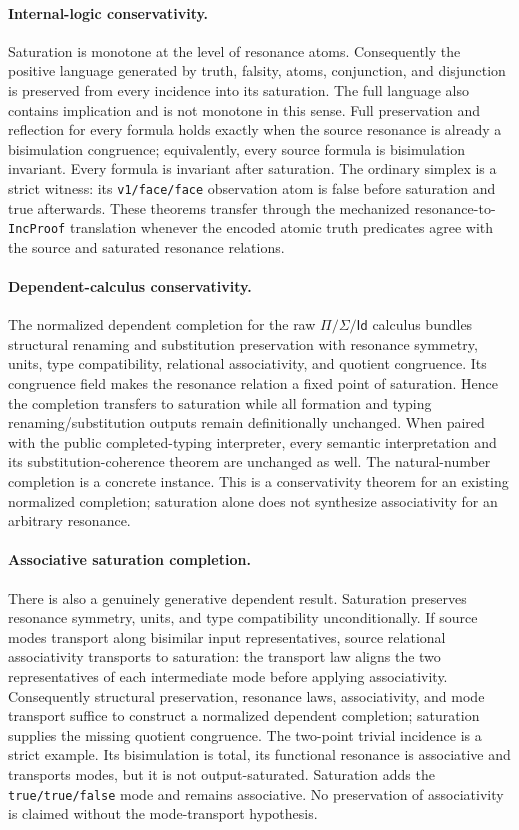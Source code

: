 \documentclass[11pt]{article}
\theoremstyle{definition}
\begin{document}
\paragraph{Internal-logic conservativity.}
Saturation is monotone at the level of resonance atoms.  Consequently the
positive language generated by truth, falsity, atoms, conjunction, and
disjunction is preserved from every incidence into its saturation.  The full
language also contains implication and is not monotone in this sense.  Full
preservation and reflection for every formula holds exactly when the source
resonance is already a bisimulation congruence; equivalently, every source
formula is bisimulation invariant.  Every formula is invariant after
saturation.  The ordinary simplex is a strict witness: its
\texttt{v1/face/face} observation atom is false before saturation and true
afterwards.  These theorems transfer through the mechanized
resonance-to-\texttt{IncProof} translation whenever the encoded atomic truth
predicates agree with the source and saturated resonance relations.

\paragraph{Dependent-calculus conservativity.}
The normalized dependent completion for the raw $\Pi/\Sigma/\mathsf{Id}$
calculus bundles structural renaming and substitution preservation with
resonance symmetry, units, type compatibility, relational associativity, and
quotient congruence.  Its congruence field makes the resonance relation a fixed
point of saturation.  Hence the completion transfers to saturation while all
formation and typing renaming/substitution outputs remain definitionally
unchanged.  When paired with the public completed-typing interpreter, every
semantic interpretation and its substitution-coherence theorem are unchanged
as well.  The natural-number completion is a concrete instance.  This is a
conservativity theorem for an existing normalized completion; saturation alone
does not synthesize associativity for an arbitrary resonance.

\paragraph{Associative saturation completion.}
There is also a genuinely generative dependent result.  Saturation preserves
resonance symmetry, units, and type compatibility unconditionally.  If source
modes transport along bisimilar input representatives, source relational
associativity transports to saturation: the transport law aligns the two
representatives of each intermediate mode before applying associativity.
Consequently structural preservation, resonance laws, associativity, and mode
transport suffice to construct a normalized dependent completion; saturation
supplies the missing quotient congruence.  The two-point trivial incidence is a
strict example.  Its bisimulation is total, its functional resonance is
associative and transports modes, but it is not output-saturated.  Saturation
adds the \texttt{true/true/false} mode and remains associative.  No preservation
of associativity is claimed without the mode-transport hypothesis.
\end{document}
